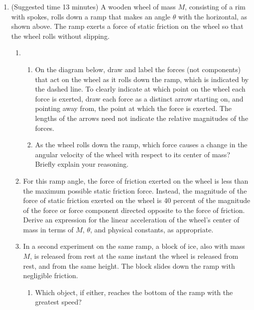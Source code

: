 \documentclass{../../../oss-apphys}
\begin{document}
\begin{enumerate}[leftmargin=15pt]
\item (Suggested time 13 minutes) A wooden wheel of mass $M$, consisting of a
  rim with spokes, rolls down a ramp that makes an angle $\theta$ with the
  horizontal, as shown above. The ramp exerts a force of static friction on the
  wheel so that the wheel rolls without slipping.
  \begin{enumerate}[leftmargin=15pt,noitemsep]
  \item
    \begin{enumerate}[leftmargin=15pt,noitemsep]
    \item On the diagram below, draw and label the forces (not components) that
      act on the wheel as it rolls down the ramp, which is indicated by the
      dashed line. To clearly indicate at which point on the wheel each force
      is exerted, draw each force as a distinct arrow starting on, and pointing
      away from, the point at which the force is exerted. The lengths of the
      arrows need not indicate the relative magnitudes of the forces.
      \begin{center}
      \end{center}
    \item As the wheel rolls down the ramp, which force causes a change in the
      angular velocity of the wheel with respect to its center of mass? Briefly
      explain your reasoning.
      \vspace{.4in}
    \end{enumerate}

  \item For this ramp angle, the force of friction exerted on the wheel is less
    than the maximum possible static friction force. Instead, the magnitude of
    the force of static friction exerted on the wheel is 40 percent of the
    magnitude of the force or force component directed opposite to the force of
    friction. Derive an expression for the linear acceleration of the wheel's
    center of mass in terms of $M$, $\theta$, and physical constants, as
    appropriate.
    \newpage
    
  \item In a second experiment on the same ramp, a block of ice, also with mass
    $M$, is released from rest at the same instant the wheel is released from
    rest, and from the same height. The block slides down the ramp with
    negligible friction.
    \begin{enumerate}[leftmargin=15pt,noitemsep]
    \item Which object, if either, reaches the bottom of the ramp with the
      greatest speed?


\end{enumerate}
\end{enumerate}
\end{enumerate}
\end{document}
